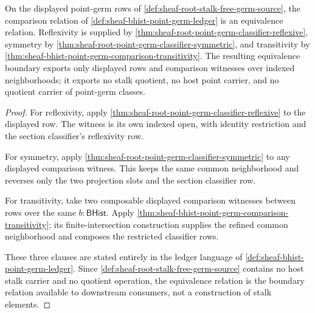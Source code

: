 \begin{theorem}
\label{thm:sheaf-root-point-germ-classifier-equivalence-boundary}
On the displayed point-germ rows of \autoref{def:sheaf-root-stalk-free-germ-source}, the comparison relation of \autoref{def:sheaf-bhist-point-germ-ledger} is an equivalence relation. Reflexivity is supplied by \autoref{thm:sheaf-root-point-germ-classifier-reflexive}, symmetry by \autoref{thm:sheaf-root-point-germ-classifier-symmetric}, and transitivity by \autoref{thm:sheaf-bhist-point-germ-comparison-transitivity}. The resulting equivalence boundary exports only displayed rows and comparison witnesses over indexed neighborhoods; it exports no stalk quotient, no host point carrier, and no quotient carrier of point-germ classes.
\end{theorem}
\begin{proof}
For reflexivity, apply \autoref{thm:sheaf-root-point-germ-classifier-reflexive} to the displayed row. The witness is its own indexed open, with identity restriction and the section classifier's reflexivity row.

For symmetry, apply \autoref{thm:sheaf-root-point-germ-classifier-symmetric} to any displayed comparison witness. This keeps the same common neighborhood and reverses only the two projection slots and the section classifier row.

For transitivity, take two composable displayed comparison witnesses between rows over the same $b:\mathsf{BHist}$. Apply \autoref{thm:sheaf-bhist-point-germ-comparison-transitivity}; its finite-intersection construction supplies the refined common neighborhood and composes the restricted classifier rows.

These three clauses are stated entirely in the ledger language of \autoref{def:sheaf-bhist-point-germ-ledger}. Since \autoref{def:sheaf-root-stalk-free-germ-source} contains no host stalk carrier and no quotient operation, the equivalence relation is the boundary relation available to downstream consumers, not a construction of stalk elements.
\end{proof}
